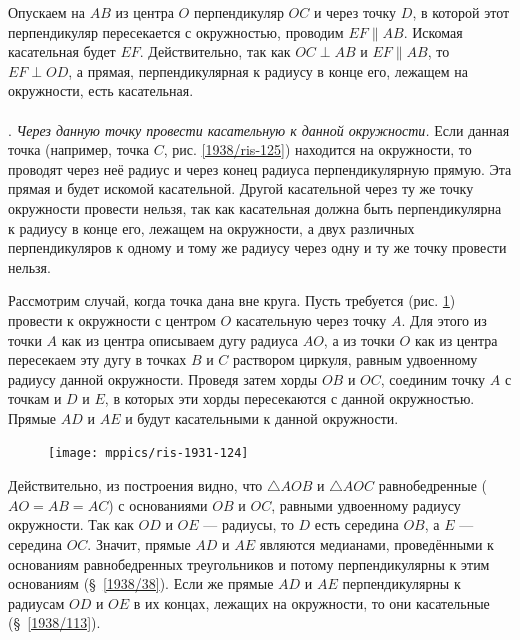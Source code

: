 \documentclass[twoside]{book}
\begin{document}
Опускаем на $AB$ из центра $O$ перпендикуляр $OC$ и через точку $D$, в которой этот перпендикуляр пересекается с окружностью, проводим $EF\parallel AB$.
Искомая касательная будет $EF$.
Действительно, так как $OC\perp AB$ и $EF\parallel AB$, то $EF\perp OD$, а прямая, перпендикулярная к радиусу в конце его, лежащем на окружности, есть касательная.

\paragraph{}\label{1931/115}
\mbox{.}
\emph{Через данную точку провести касательную к данной окружности.}
Если данная точка (например, точка $C$, рис. \ref{1938/ris-125}) находится на окружности, то проводят через неё радиус и через конец радиуса перпендикулярную прямую.
Эта прямая и будет искомой касательной.
Другой касательной через ту же точку окружности провести нельзя, так как касательная должна быть перпендикулярна к радиусу в конце его, лежащем на окружности, а двух различных перпендикуляров к одному и тому же радиусу через одну и ту же точку провести нельзя.

Рассмотрим случай, когда точка дана вне круга.
Пусть требуется (рис. \ref{1931/ris-124}) провести к окружности с центром $O$ касательную через точку $A$.
Для этого из точки $A$ как из центра описываем дугу радиуса $AO$, а из точки $O$ как из центра пересекаем эту дугу в точках $B$ и $C$ раствором циркуля, равным удвоенному радиусу данной окружности.
Проведя затем хорды $OB$ и $OC$, соединим точку $A$ с точкам и $D$ и $E$, в которых эти хорды пересекаются с
данной окружностью.
Прямые $AD$ и $AE$ и будут касательными к данной окружности.

\begin{figure}
\centering
\texttt{[image: mppics/ris-1931-124]}
\caption{}\label{1931/ris-124}
\end{figure}

Действительно, из построения видно, что $\triangle AOB$ и $\triangle AOC$ равнобедренные ($AO=AB=AC$) с основаниями $OB$ и $OC$, равными удвоенному радиусу окружности.
Так как $OD$ и $OE$ --- радиусы, то $D$ есть середина $OB$, а $E$ --- середина $OC$.
Значит, прямые $AD$ и $AE$ являются медианами, проведёнными к основаниям равнобедренных треугольников и потому перпендикулярны к этим основаниям (§~\ref{1938/38}).
Если же прямые $AD$ и $AE$ перпендикулярны к радиусам $OD$ и $OE$ в их концах, лежащих
на окружности, то они касательные (§~\ref{1938/113}).
\end{document}
